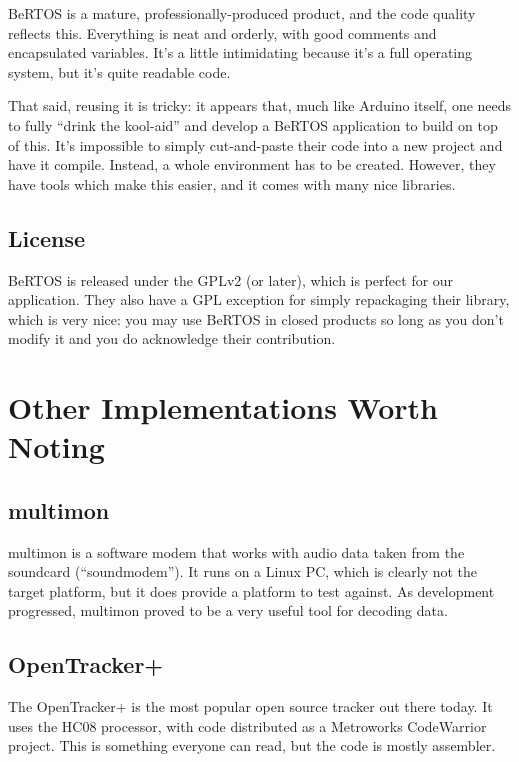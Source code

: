 BeRTOS is a mature, professionally-produced product, and the code
quality reflects this.  Everything is neat and orderly, with good
comments and encapsulated variables.  It's a little intimidating
because it's a full operating system, but it's quite readable code.

That said, reusing it is tricky: it appears that, much like Arduino
itself, one needs to fully ``drink the kool-aid'' and develop a BeRTOS
application to build on top of this.  It's impossible to simply
cut-and-paste their code into a new project and have it compile.
Instead, a whole environment has to be created.  However, they have
tools which make this easier, and it comes with many nice libraries.

\subsection{License}

BeRTOS is released under the GPLv2 (or later), which is perfect for
our application.  They also have a GPL exception for simply repackaging
their library, which is very nice: you may use BeRTOS in closed
products so long as you don't modify it and you do acknowledge their
contribution.



\section{Other Implementations Worth Noting}

\subsection{multimon}

multimon\cite{multimon} is a software modem that works with audio data taken from the
soundcard (``soundmodem'').  It runs on a Linux PC, which is clearly
not the target platform, but it does provide a platform to test
against.  As development progressed, multimon proved to be a very
useful tool for decoding data.

\subsection{OpenTracker+}

The OpenTracker+\cite{opentracker} is the most popular open source
\aprs tracker out there today.  It uses the HC08 processor, with code
distributed as a Metroworks CodeWarrior project.  This is something
everyone can read, but the code is mostly assembler.

